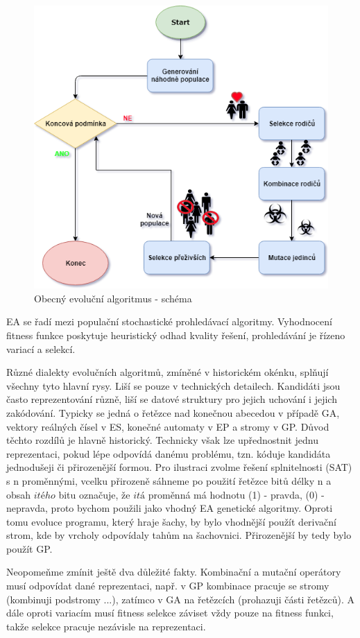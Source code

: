 \begin{figure}[h]\centering
\includegraphics[scale=0.64]{../img/EA.png}
\caption{Obecný evoluční algoritmus - schéma}
\end{figure}
EA se řadí mezi populační stochastické prohledávací	algoritmy. Vyhodnocení fitness funkce poskytuje heuristický odhad kvality řešení, prohledávání je řízeno variací a selekcí. \par
Různé dialekty evolučních algoritmů, zmíněné v historickém okénku, splňují všechny tyto hlavní rysy. Liší se pouze v technických detailech. Kandidáti jsou často reprezentování různě, liší se datové struktury pro jejich uchování i jejich zakódování. Typicky se jedná o řetězce nad konečnou abecedou v případě GA, vektory reálných čísel v ES, konečné automaty v EP a stromy v GP. Důvod těchto rozdílů je hlavně historický. Technicky však lze upřednostnit jednu reprezentaci, pokud lépe odpovídá danému problému, tzn. kóduje kandidáta jednodušeji či přirozenější formou. Pro ilustraci zvolme řešení splnitelnosti (SAT) s n proměnnými, vcelku přirozeně sáhneme po použití řetězce bitů délky n a obsah $itého$ bitu označuje, že $itá$ proměnná má hodnotu (1) - pravda, (0) - nepravda, proto bychom použili jako vhodný EA genetické algoritmy. Oproti tomu evoluce programu, který hraje šachy, by bylo vhodnější použít derivační strom, kde by vrcholy odpovídaly tahům na šachovnici. Přirozenější by tedy bylo použít GP. \par
Neopomeňme zmínit ještě dva důležité fakty. Kombinační a mutační operátory musí odpovídat dané reprezentaci, např. v GP kombinace pracuje se stromy (kombinuji podstromy ...), zatímco v GA na řetězcích (prohazuji části řetězců). A dále oproti variacím musí fitness selekce záviset vždy pouze na fitness funkci, takže selekce pracuje nezávisle na reprezentaci.
